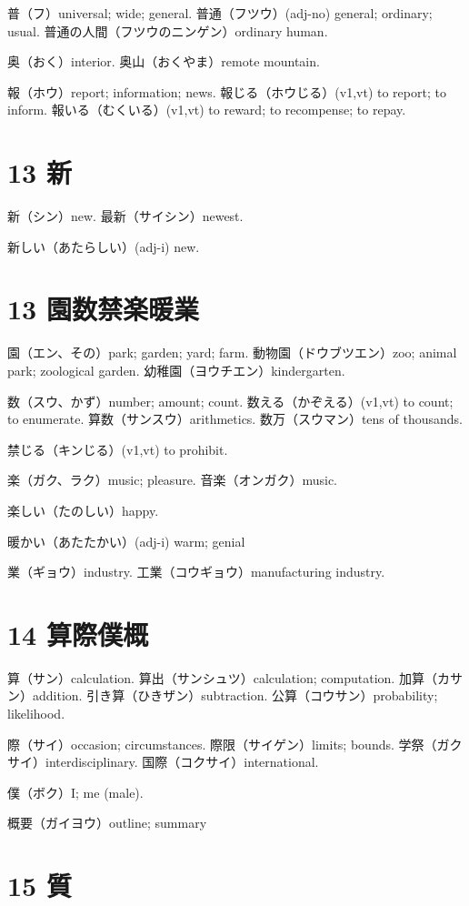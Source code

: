 普（フ）universal; wide; general.
普通（フツウ）(adj-no) general; ordinary; usual.
普通の人間（フツウのニンゲン）ordinary human.

奥（おく）interior.
奥山（おくやま）remote mountain.

報（ホウ）report; information; news.
報じる（ホウじる）(v1,vt) to report; to inform.
報いる（むくいる）(v1,vt) to reward; to recompense; to repay.

\section{13 新}

新（シン）new.
最新（サイシン）newest.

新しい（あたらしい）(adj-i) new.

\section{13 園数禁楽暖業}

園（エン、その）park; garden; yard; farm.
動物園（ドウブツエン）zoo; animal park; zoological garden.
幼稚園（ヨウチエン）kindergarten.

数（スウ、かず）number; amount; count.
数える（かぞえる）(v1,vt) to count; to enumerate.
算数（サンスウ）arithmetics.
数万（スウマン）tens of thousands.

禁じる（キンじる）(v1,vt) to prohibit.

楽（ガク、ラク）music; pleasure.
音楽（オンガク）music.

楽しい（たのしい）happy.

暖かい（あたたかい）(adj-i) warm; genial

業（ギョウ）industry.
工業（コウギョウ）manufacturing industry.

\section{14 算際僕概}

算（サン）calculation.
算出（サンシュツ）calculation; computation.
加算（カサン）addition.
引き算（ひきザン）subtraction.
公算（コウサン）probability; likelihood.

際（サイ）occasion; circumstances.
際限（サイゲン）limits; bounds.
学祭（ガクサイ）interdisciplinary.
国際（コクサイ）international.

僕（ボク）I; me (male).

概要（ガイヨウ）outline; summary

\section{15 質}


